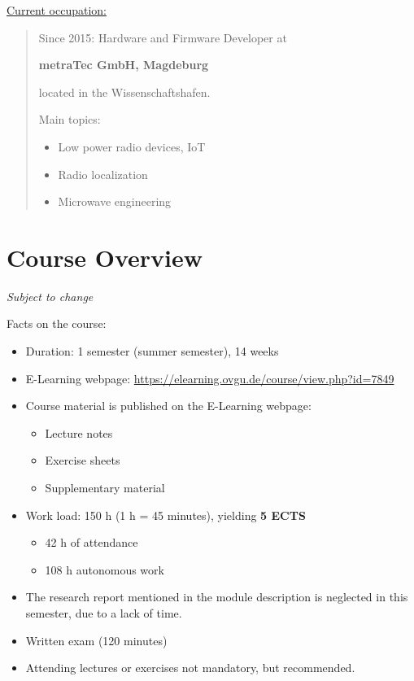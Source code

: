 \vspace{2em}

\underline{Current occupation:}

\begin{quote}
	Since 2015: Hardware and Firmware Developer at
	
	\textbf{metraTec GmbH, Magdeburg}
	
	located in the Wissenschaftshafen.
	
	\vspace{1em}
	
	Main topics:
	\begin{itemize}
		\item Low power radio devices, IoT
		\item Radio localization
		\item Microwave engineering
	\end{itemize}
\end{quote}


\section{Course Overview}

\textit{Subject to change}

Facts on the course:
\begin{itemize}
	\item Duration: 1 semester (summer semester), 14 weeks
	\item E-Learning webpage: \url{https://elearning.ovgu.de/course/view.php?id=7849}
	\item Course material is published on the E-Learning webpage:
	\begin{itemize}
		\item Lecture notes
		\item Exercise sheets
		\item Supplementary material
	\end{itemize}
	\item Work load: 150 h (1 h = 45 minutes), yielding \textbf{5 ECTS}
	\begin{itemize}
		\item 42 h of attendance
		\item 108 h autonomous work
	\end{itemize}
	\item The research report mentioned in the module description is neglected in this semester, due to a lack of time.
	\item Written exam (120 minutes)
	\item Attending lectures or exercises not mandatory, but recommended.
\end{itemize}

